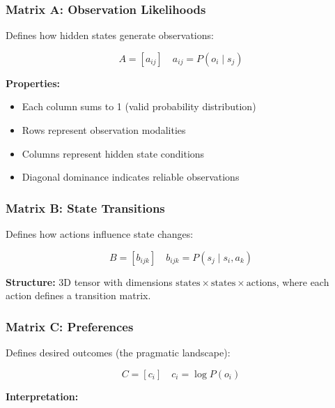 \documentclass[
]{article}
\providecommand{\tightlist}{%
  \setlength{\itemsep}{0pt}\setlength{\parskip}{0pt}}
\begin{document}
\subsubsection{Matrix A: Observation
Likelihoods}\label{matrix-a-observation-likelihoods}

Defines how hidden states generate observations:

\begin{equation}
A = [a_{ij}] \quad a_{ij} = P(o_i \mid s_j)
\label{eq:matrix_a}
\end{equation}

\textbf{Properties:}

\begin{itemize}
\tightlist
\item
  Each column sums to 1 (valid probability distribution)
\item
  Rows represent observation modalities
\item
  Columns represent hidden state conditions
\item
  Diagonal dominance indicates reliable observations
\end{itemize}

\subsubsection{Matrix B: State
Transitions}\label{matrix-b-state-transitions}

Defines how actions influence state changes:

\begin{equation}
B = [b_{ijk}] \quad b_{ijk} = P(s_j \mid s_i, a_k)
\label{eq:matrix_b}
\end{equation}

\textbf{Structure:} 3D tensor with dimensions
\(\text{states} \times \text{states} \times \text{actions}\), where each
action defines a transition matrix.

\subsubsection{Matrix C: Preferences}\label{matrix-c-preferences}

Defines desired outcomes (the pragmatic landscape):

\begin{equation}
C = [c_i] \quad c_i = \log P(o_i)
\label{eq:matrix_c}
\end{equation}

\textbf{Interpretation:}
\end{document}

